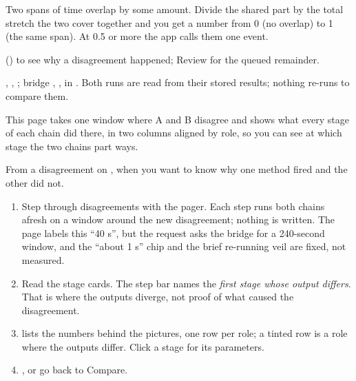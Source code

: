 \begin{plainterms}
Two spans of time overlap by some amount. Divide the shared part by the total stretch the two cover
together and you get a number from 0 (no overlap) to 1 (the same span). At 0.5 or more the app calls
them one event.
\end{plainterms}

 () to see why a disagreement happened; Review
for the queued remainder.

\begin{underthehood}
, , ;
bridge , ,  in
. Both runs are read from their stored results; nothing re-runs to
compare them.
\end{underthehood}

This page takes one window where A and B disagree and shows what every stage of each chain did
there, in two columns aligned by role, so you can see at which stage the two chains part ways.

From a disagreement on , when you want to know why one method fired and
the other did not.


\begin{enumerate}
  \item Step through disagreements with the pager. Each step runs both chains afresh on a window
        around the new disagreement; nothing is written. The page labels this ``40 s'', but the
        request asks the bridge for a 240-second window, and the ``about 1 s'' chip and the
        brief re-running veil are fixed, not measured.
  \item Read the stage cards. The step bar names the \emph{first stage whose output differs}. That
        is where the outputs diverge, not proof of what caused the disagreement.
  \item {} lists the numbers behind the pictures, one row per role;
        a tinted row is a role where the outputs differ. Click a stage for its parameters.
  \item {}, or go back to Compare.
\end{enumerate}

